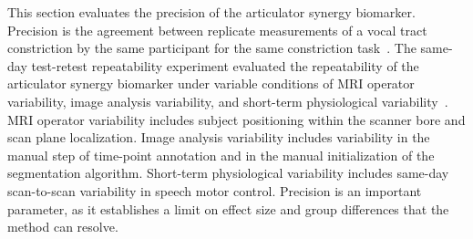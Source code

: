 \documentclass[preprint]{JASAnew}\usepackage[]{graphicx}\usepackage[]{color}
\begin{document}
This section evaluates the precision of the articulator synergy biomarker. Precision is the agreement between replicate measurements of a vocal tract constriction by the same participant for the same constriction task~\citep{kessler2015emerging,sullivan2015metrology}. 
%
The same-day test-retest repeatability experiment evaluated the repeatability of the articulator synergy biomarker under variable conditions of MRI operator variability, image analysis variability, and short-term physiological variability~\cite{toger2017test}. 
%
MRI operator variability includes subject positioning within the scanner bore and scan plane localization. 
%
Image analysis variability includes variability in the manual step of time-point annotation and in the manual initialization of the segmentation algorithm. 
%
Short-term physiological variability includes same-day scan-to-scan variability in speech motor control. 
%
Precision is an important parameter, as it establishes a limit on effect size and group differences that the method can resolve.
\end{document}
